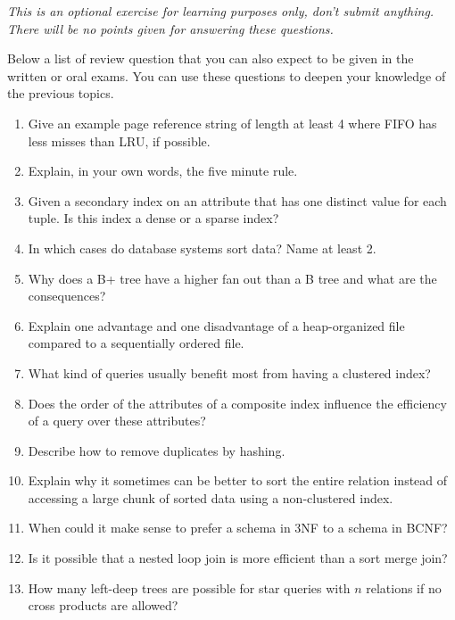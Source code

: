 \newpage
{}
\textit{This is an optional exercise for learning purposes only, don't submit anything. There will be no points given for answering these questions.}

Below a list of review question that you can also expect to be given in the written or oral exams.
You can use these questions to deepen your knowledge of the previous topics.

\begin{enumerate}[label=\arabic*.]

  \item Give an example page reference string of length at least 4 where FIFO has less misses than LRU, if possible.

  \item Explain, in your own words, the five minute rule.

  \item Given a secondary index on an attribute that has one distinct value for each tuple. Is this index a dense or a sparse index?

  \item In which cases do database systems sort data? Name at least 2.
  \item Why does a B+ tree have a higher fan out than a B tree and what are the consequences?

  \item Explain one advantage and one disadvantage of a heap-organized file compared to a sequentially ordered file.
  \item What kind of queries usually benefit most from having a clustered index?
  \item Does the order of the attributes of a composite index influence the efficiency of a query over these attributes?
  \item Describe how to remove duplicates by hashing.
  \item Explain why it sometimes can be better to sort the entire relation instead of accessing a large chunk of sorted data using a non-clustered index.
  \item When could it make sense to prefer a schema in 3NF to a schema in BCNF?

  \item Is it possible that a nested loop join is more efficient than a sort merge join?

  \item How many left-deep trees are possible for star queries with $n$ relations if no cross products are allowed?


\end{enumerate}
